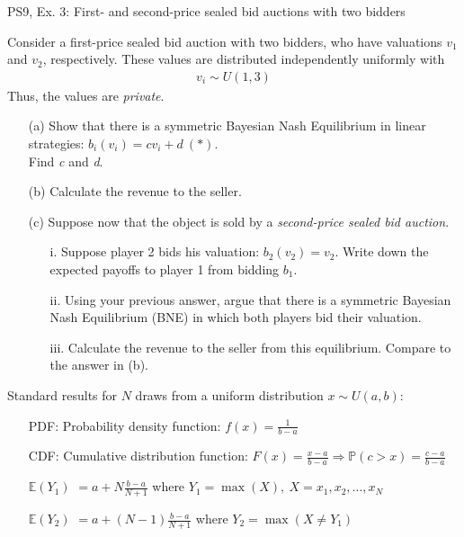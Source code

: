 \begin{frame}{PS9, Ex. 3: First- and second-price sealed bid auctions with two bidders}
    \begin{multicols}{2}
      Consider a first-price sealed bid auction with two bidders, who have valuations $v_1$ and $v_2$, respectively. These values are distributed independently uniformly with
      \begin{align*}
        v_i\sim U(1,3)
      \end{align*}
      Thus, the values are \textit{private}.
      \begin{itemize}
        \item[(a)] Show that there is a symmetric Bayesian Nash Equilibrium in linear strategies: $b_i(v_i) = cv_i + d\ (*)$.\\
                   Find \textit{c} and \textit{d}.
        \item[(b)] Calculate the revenue to the seller.
      \end{itemize}
      \vfill\null\columnbreak
      \begin{itemize}
        \item[(c)] Suppose now that the object is sold by a \textit{second-price sealed bid auction}.
        \begin{itemize}\normalsize
          \item[i.]   Suppose player 2 bids his valuation: $b_2(v_2) = v_2$. Write down the expected payoffs to player 1 from bidding $b_1$.
          \item[ii.]  Using your previous answer, argue that there is a symmetric Bayesian Nash Equilibrium (BNE) in which both players bid their valuation.
          \item[iii.] Calculate the revenue to the seller from this equilibrium. Compare to the answer in (b).
        \end{itemize}
      \end{itemize}
      \vfill\null
    \end{multicols}
    \vspace{-16pt}
    Standard results for $N$ draws from a uniform distribution $x\sim U(a, b):$
    \begin{enumerate}
      \item[PDF:] Probability density function: $f(x)=\frac{1}{b-a}$
      \item[CDF:] Cumulative distribution function: $F(x)=\frac{x-a}{b-a}\Rightarrow\mathbb{P}(c>x)=\frac{c-a}{b-a}$
      \item[$\mathbb{E}(Y_1)$] $=a+N\frac{b-a}{N+1}$ where $Y_1=\max(X),\ X=x_1,x_2,...,x_N$
      \item[$\mathbb{E}(Y_2)$] $=a+(N-1)\frac{b-a}{N+1}$ where $Y_2=\max(X\neq Y_1)$
    \end{enumerate}
    \vfill\null
\end{frame}


